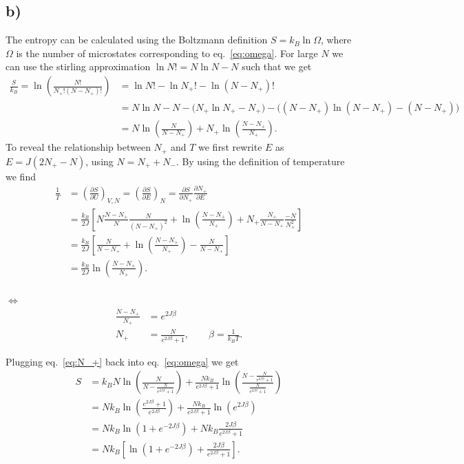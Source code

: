\documentclass[reprint, amsmath, amssymb, aps, onecolumn]{revtex4-2}
\newcommand{\LLRA}{\\[-1.3\baselineskip] $\Longleftrightarrow$ \\[-1.3\baselineskip]}
\newcommand{\dd}[3]{\left(\frac{\partial #1}{\partial #2}\right)_{#3}}
\begin{document}
\subsection*{b)}
\noindent The entropy can be calculated using the Boltzmann definition $S = k_B \ln{\Omega}$, where $\Omega$ is the number of microstates corresponding to eq.~\eqref{eq:omega}. For large $N$ we can use the stirling approximation $\ln{N!} = N\ln{N} - N$ such that we get
\begin{align}
  \frac{S}{k_B} = \ln{\left(\frac{N!}{N_+!(N-N_+)!} \right)} &= \ln{N!} - \ln{N_+!} - \ln{(N-N_+)!} \nonumber\\
  &= N\ln{N} - N -\big(N_+ \ln{N_+} - N_+\big) - \big((N-N_+)\ln{(N-N_+)} - (N - N_+)\big) \nonumber\\
  &= N\ln{\left(\frac{N}{N-N_+}\right)} +  N_+ \ln{\left(\frac{N-N_+}{N_+}\right)}. \label{eq:S1}
\end{align}
To reveal the relationship between $N_+$ and $T$ we first rewrite $E$ as $E = J(2N_+ - N)$, using $N = N_+ + N_-$. By using the definition of temperature we find
\begin{align*}
  \frac{1}{T} &= \dd{S}{U}{V,N} = \dd{S}{E}{N} = \frac{\partial S}{\partial N_+}\frac{\partial N_+}{\partial E} \\
  &= \frac{k_B}{2J}\left[N\frac{N-N_+}{N}\frac{N}{(N-N_+)^2} + \ln{\left(\frac{N-N_+}{N_+}\right)} + N_+ \frac{N_+}{N-N_+} \frac{-N}{N_+^2}  \right] \\
  &= \frac{k_B}{2J}\left[ \frac{N}{N-N_+} + \ln{\left(\frac{N-N_+}{N_+}\right)} - \frac{N}{N-N_+}\right] \\
  &= \frac{k_B}{2J} \ln{\left(\frac{N-N_+}{N_+}\right)}.
\end{align*}
\LLRA
\begin{align}
  \frac{N-N_+}{N_+} &= e^{2J\beta} \nonumber\\
  N_+ &= \frac{N}{e^{2J\beta} + 1}, \qquad \beta = \frac{1}{k_B T}. \label{eq:N_+}
\end{align}

Plugging eq.~\eqref{eq:N_+} back into eq.~\eqref{eq:omega} we get
\begin{align*}
  S &= k_BN\ln{\left(\frac{N}{N-\frac{N}{e^{2J\beta} + 1}}\right)} +  \frac{Nk_B}{e^{2J\beta} + 1} \ln{\left(\frac{N-\frac{N}{e^{2J\beta} + 1}}{\frac{N}{e^{2J\beta} + 1}}\right)} \\
  &=  Nk_B\ln{\left(\frac{e^{2J\beta} + 1}{e^{2J\beta}}\right)} + \frac{Nk_B}{e^{2J\beta} + 1} \ln{\left(e^{2J\beta}\right)} \\
  &=  Nk_B\ln{\left(1 + e^{-2J\beta}\right)} + Nk_B\frac{2J\beta}{e^{2J\beta} + 1} \\
  &=  Nk_B\left[\ln{(1 + e^{-2J\beta})}
 + \frac{2J\beta}{e^{2J\beta} + 1} \right]. \\
\end{align*}
%
%
\end{document}
